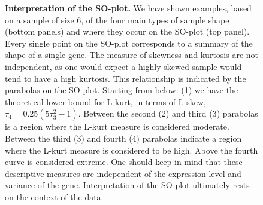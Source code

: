 \documentclass[a4paper, 10pt]{article}\usepackage[]{graphicx}\usepackage[]{color}
\begin{document}
\begin{figure}[!h]
\centerline{}
\caption{{\bf Interpretation of the SO-plot.}
       We have shown examples, 
       based on a sample of size 6, of the 
       four main types of sample shape
       (bottom panels) and where they
       occur on the SO-plot (top panel).
       Every single point on the SO-plot corresponds
       to a summary of the shape of a single 
       gene.
       The measure of skewness and kurtosis 
       are not independent, as one would 
       expect a highly skewed sample would
       tend to have a high kurtosis.
       This relationship is indicated by 
       the parabolas on the SO-plot.
       Starting from below:
       (1) we have the theoretical lower
       bound for L-kurt, in terms of L-skew,
       $\tau_4 = 0.25 (5\tau^2_3 - 1)$.
       Between the second (2) and third (3)
       parabolas is a region where the 
       L-kurt measure is considered moderate.
       Between the third (3) and fourth (4)
       parabolas indicate a region where 
       the L-kurt measure is considered to be high. 
       Above the fourth curve is considered extreme.
       One should keep in mind that these descriptive 
       measures are independent of the expression level and
       variance of the gene. Interpretation of the 
       SO-plot ultimately rests on the context of the data.}
\label{interpret}
\end{figure}
\end{document}
